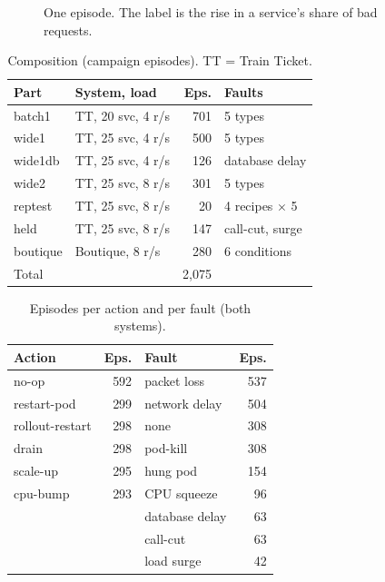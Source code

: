 \documentclass[10pt,conference]{IEEEtran}
\begin{document}
\begin{figure}[t]
\centering
{}
\caption{One episode. The label is the rise in a service's share of bad requests.}
\label{fig:episode}
\end{figure}

\begin{table}[t]
\centering
\caption{Composition (campaign episodes). TT = Train Ticket.}
\label{tab:parts}
\footnotesize
\begin{tabularx}{\columnwidth}{@{}p{1.55cm}p{2.9cm}rX@{}}
\toprule
Part & System, load & Eps. & Faults \\
\midrule
batch1 & TT, 20 svc, 4 r/s & 701 & 5 types \\
wide1 & TT, 25 svc, 4 r/s & 500 & 5 types \\
wide1db & TT, 25 svc, 4 r/s & 126 & database delay \\
wide2 & TT, 25 svc, 8 r/s & 301 & 5 types \\
reptest & TT, 25 svc, 8 r/s & 20 & 4 recipes $\times$ 5 \\
held & TT, 25 svc, 8 r/s & 147 & call-cut, surge \\
boutique & Boutique, 8 r/s & 280 & 6 conditions \\
\midrule
Total & & 2{,}075 & \\
\bottomrule
\end{tabularx}
\end{table}

\begin{table}[t]
\centering
\caption{Episodes per action and per fault (both systems).}
\label{tab:counts}
\footnotesize
\begin{tabularx}{\columnwidth}{@{}XrXr@{}}
\toprule
Action & Eps. & Fault & Eps. \\
\midrule
no-op & 592 & packet loss & 537 \\
restart-pod & 299 & network delay & 504 \\
rollout-restart & 298 & none & 308 \\
drain & 298 & pod-kill & 308 \\
scale-up & 295 & hung pod & 154 \\
cpu-bump & 293 & CPU squeeze & 96 \\
 & & database delay & 63 \\
 & & call-cut & 63 \\
 & & load surge & 42 \\
\bottomrule
\end{tabularx}
\end{table}
\end{document}
